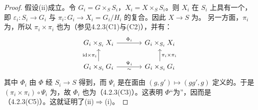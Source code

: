 \begin{proof}
假设(ii)成立。令 $G_i=G\times_S S_i$，$X_i=X\times_S S_i$。则 $X_i$ 在 $S_i$ 上具有一个，即 $\varepsilon_i:S_i\to G_i$ 与 $\pi_i:G_i\to X_i=G_i/H_i$ 的复合。因此 $X\to S$ 为。
另一方面，$\pi_i$ 为，所以 $\pi_i\times\pi_i$ 也为（参见4.2.3(C1)与(C2)），并有：
\[
\begin{tikzcd}[column sep=large]
G_i\times_{S_i}X_i\arrow[r,"\Phi_i"]&G_i\times_{S_i}X_i\\
G_i\times_{S_i}G_i\arrow[u,"\mathrm{id}\times\pi_i"]\arrow[r,"\Psi_i","\sim"']&G_i\times_{S_i}G_i\arrow[u,"\pi_i\times\pi_i"']
\end{tikzcd}
\]
其中 $\Phi_i$ 由 $\Phi$ 经 $S_i\to S$ 得到，而 $\Psi_i$ 是在面由 $(g,g')\mapsto(gg',g)$ 定义的。于是 $(\pi_i\times\pi_i)\circ\Psi_i$ 为，故 $\Phi_i$ 也为（4.2.3(C3)）。这表明 $\Phi$“为”，因而是（4.2.3(C5)）。这就证明了(ii)$\Rightarrow$(i)。


\end{proof}
